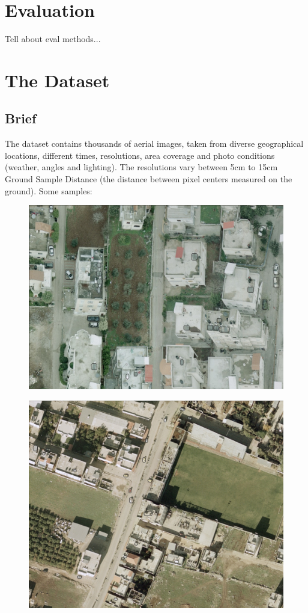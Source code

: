 \documentclass[]{article}
\begin{document}
\section{Evaluation}
Tell about eval methods...

\section{The Dataset}
\subsection{Brief}
The dataset contains thousands of aerial images, taken from diverse geographical locations, different times, resolutions, area coverage and photo conditions (weather, angles and lighting). The resolutions vary between 5cm to 15cm Ground Sample Distance (the distance between pixel centers measured on the ground). Some samples:\\
\begin{figure}[!h]
\centering
\includegraphics[width=1\linewidth]{"images/im1"}
\end{figure}
\begin{figure}[!h]
\centering
\includegraphics[width=1\linewidth]{"images/im2"}
\end{figure}
\end{document}
